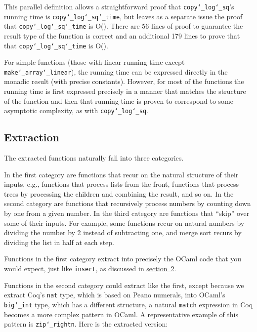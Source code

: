 \documentclass{llncs}
\newcommand{\ChapRef}[2]{\SecRef{#1}{#2}}
\newcommand{\SecRef}[2]{section~#1}
\newcommand{\ChapRefLocal}[3]{\hyperref[#1]{\ChapRef{#2}{#3}}}
\newcommand{\Scribtexttt}[1]{{\texttt{#1}}}
\let\SOriginalthesubsubsection\thesubsubsection
\newcommand{\Ssubsection}[2]{\subsection[#1]{#2}\let\thesubsubsection\SOriginalthesubsubsection}
\begin{document}
\noindent  This parallel
definition allows a straightforward proof that \Scribtexttt{copy{\char`\_}log{\char`\_}sq}{'}s
running time is \Scribtexttt{copy{\char`\_}log{\char`\_}sq{\char`\_}time}, but leaves as a separate
issue the proof that \Scribtexttt{copy{\char`\_}log{\char`\_}sq{\char`\_}time} is O().
There are 56 lines of proof to guarantee the result type of
the function is correct and an additional 179 lines to prove that that
\Scribtexttt{copy{\char`\_}log{\char`\_}sq{\char`\_}time} is O().

For simple functions (those with linear running time except
\Scribtexttt{make{\char`\_}array{\char`\_}linear}), the running time can be expressed directly in
the monadic result (with precise constants). However, for most of the
functions the running time is first expressed precisely in a manner
that matches the structure of the function and then that running time
is proven to correspond to some asymptotic complexity, as with
\Scribtexttt{copy{\char`\_}log{\char`\_}sq}.

\Ssubsection{Extraction}{Extraction}\label{t:x28part_x22Extractionx22x29}

The extracted functions naturally fall into three categories.

In the first category are functions that recur on the natural
structure of their inputs, e.g., functions that process lists from the
front, functions that process trees by
processing the children and combining the result, and so on. In the
second category are functions that recursively process numbers by
counting down by one from a given number.  In the third category are
functions that {``}skip{''} over some of their inputs. For example,
some functions recur on natural numbers by dividing the
number by 2 instead of subtracting one, and merge sort recurs by
dividing the list in half at each step.

Functions in the first category extract into precisely the OCaml code
that you would expect, just like \Scribtexttt{insert}, as discussed in
\ChapRefLocal{t:x28part_x22secx3ainsertx22x29}{2}{Overview of Our Library}.

Functions in the second category could extract like the first, except
because we extract Coq{'}s \Scribtexttt{nat} type, which is based on Peano
numerals, into OCaml{'}s \Scribtexttt{big{\char`\_}int} type, which has a different
structure, a natural \Scribtexttt{match} expression in Coq becomes a more
complex pattern in OCaml. A representative example of this pattern is
\Scribtexttt{zip{\char`\_}rightn}. Here is the extracted version:
\end{document}
